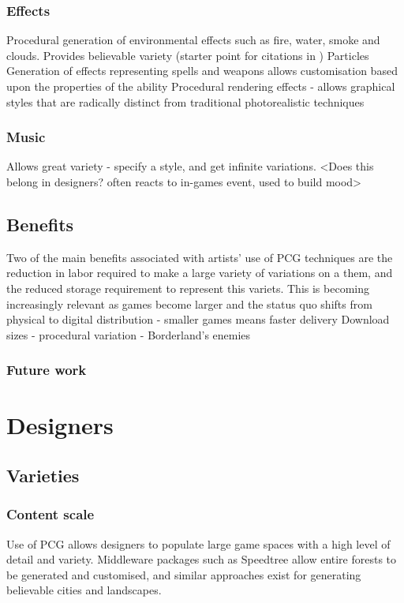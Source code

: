 \documentclass{./acm_proc_article-sp}
\begin{document}
\subsubsection{Effects}
Procedural generation of environmental effects such as fire, water, smoke and clouds. Provides believable variety (starter point for citations in \cite{hendrikx2012procedural})
Particles
Generation of effects representing spells and weapons allows customisation based upon the properties of the ability \cite{particles}
Procedural rendering effects - allows graphical styles that are radically distinct from traditional photorealistic techniques \cite{kowalski1999art}
\subsubsection{Music}
Allows great variety - specify a style, and get infinite variations. \cite{collins2009introduction} <Does this belong in designers? often reacts to in-games event, used to build mood>

\subsection{Benefits}
Two of the main benefits associated with artists' use of PCG techniques are the reduction in labor required to make a large variety of variations on a them, and the reduced storage requirement to represent this variets. This is becoming increasingly relevant as games become larger and the status quo shifts from physical to digital distribution - smaller games means faster delivery
Download sizes - procedural variation - Borderland's enemies
\subsubsection{Future work}

\section{Designers}

\subsection{Varieties}
\subsubsection{Content scale}
Use of PCG allows designers to populate large game spaces with a high level of detail and variety. Middleware packages such as Speedtree\cite{speedtree} allow entire forests to be generated and customised, and similar approaches exist for generating believable cities and landscapes.
\end{document}
